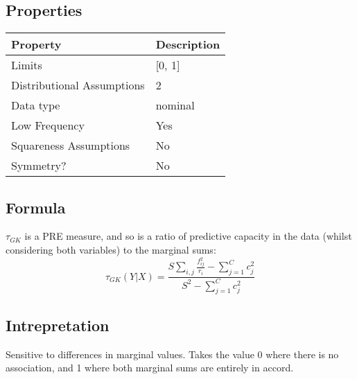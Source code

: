 \documentclass[11pt]{article}
\begin{document}

\subsection{Properties}
\begin{tabular}{| l || l |}
    \hline
    {\bf Property} & {\bf Description} \\
    \hline
    Limits & [0, 1] \\ \hline

    Distributional Assumptions& 2 \\ \hline

    Data type & nominal \\ \hline

    Low Frequency & Yes \\ \hline

    Squareness Assumptions & No \\ \hline
    
    Symmetry? & No \\ \hline

\end{tabular}


\subsection{Formula}
$\tau_{GK}$ is a PRE measure, and so is a ratio of predictive capacity in the data (whilst considering both variables) to the marginal sums:
$$
\tau_{GK}(Y|X) = \frac{   S \sum_{i, j}{ \frac{ f_{ij}^2 }{ r_i } } - \sum_{j=1}^{C}{ c_j^2 }    }{   S^2 - \sum_{j=1}^{C}{ c_j^2 }    }
$$

\subsection{Intrepretation}
Sensitive to differences in marginal values.  Takes the value 0 where there is no association, and 1 where both marginal sums are entirely in accord.
\end{document}
